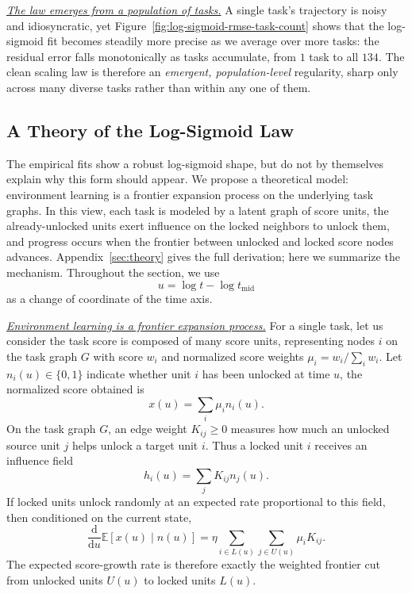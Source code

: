 \underline{\textit{The law emerges from a population of tasks.}}
A single task's trajectory is noisy and idiosyncratic, yet
Figure~\ref{fig:log-sigmoid-rmse-task-count} shows that the log-sigmoid fit
becomes steadily more precise as we average over more tasks: the residual error
falls monotonically as tasks accumulate, from $1$ task to all $134$. The clean
scaling law is therefore an \emph{emergent, population-level} regularity, sharp
only across many diverse tasks rather than within any one of them. 

\FloatBarrier

\subsection{A Theory of the Log-Sigmoid Law}
\label{sec:why-log-sigmoid}

The empirical fits show a robust log-sigmoid shape, but do not by themselves explain why this form should appear. We propose a theoretical model: environment learning is a frontier expansion process on the underlying task graphs. In this view, each task is modeled by a latent graph of score units, the already-unlocked units exert influence on the locked neighbors to unlock them, and progress occurs when the frontier between unlocked and locked score nodes advances. Appendix~\ref{sec:theory} gives the full derivation; here we summarize the mechanism. Throughout the section, we use 
\[
u = \log t - \log t_{\mathrm{mid}}
\] 
as a change of coordinate of the time axis.

\underline{\textit{Environment learning is a frontier expansion process.}}
For a single task, let us consider the task score is composed of many score units, representing nodes \(i\) on the task graph \(G\) with score \(w_i\) and normalized score weights \(\mu_i = w_i / \sum_i w_i\). Let \(n_i(u)\in\{0,1\}\) indicate whether unit \(i\) has been unlocked at time \(u\), the normalized score obtained is
\[
    x(u)=\sum_i \mu_i n_i(u).
\]
On the task graph \(G\), an edge weight \(K_{ij}\ge0\) measures how much an unlocked source unit \(j\) helps unlock a target unit \(i\). Thus a locked unit \(i\) receives an influence field
\[
    h_i(u)=\sum_j K_{ij}n_j(u).
\]
If locked units unlock randomly at an expected rate proportional to this field, then conditioned on the current state,
\begin{equation}
    \label{eq:frontier-expansion-naive}
    \frac{\mathrm d}{\mathrm du}\mathbb E[x(u)\mid n(u)]= \eta \sum_{i\in L(u)}\sum_{j\in U(u)}\mu_iK_{ij}.
\end{equation}
The expected score-growth rate is therefore exactly the weighted frontier cut from unlocked units \(U(u)\) to locked units \(L(u)\).

